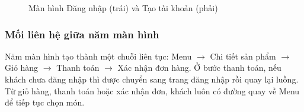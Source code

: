\begin{figure}[htbp]
  \centering
  \hfill
  \caption{Màn hình Đăng nhập (trái) và Tạo tài khoản (phải)}
  \label{fig:ui-auth}
\end{figure}

\subsubsection{Mối liên hệ giữa năm màn hình}

Năm màn hình tạo thành một chuỗi liên tục: Menu $\rightarrow$ Chi tiết sản phẩm $\rightarrow$ Giỏ hàng $\rightarrow$ Thanh toán $\rightarrow$ Xác nhận đơn hàng. Ở bước thanh toán, nếu khách chưa đăng nhập thì được chuyển sang trang đăng nhập rồi quay lại luồng. Từ giỏ hàng, thanh toán hoặc xác nhận đơn, khách luôn có đường quay về Menu để tiếp tục chọn món.